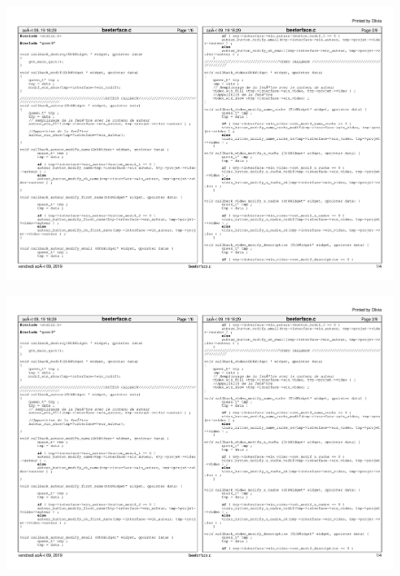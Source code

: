 \documentclass[11pt,french,a4paper]{report}
\begin{document}
\begin{landscape}
\begin{figure}[h]
    \centering
    \includegraphics[page=2,scale=0.9]{../code/beeterface.pdf}
\end{figure}

\begin{figure}[h]
    \centering
    \includegraphics[page=3,scale=0.9]{../code/beeterface.pdf}
\end{figure}


\end{landscape}
\end{document}
